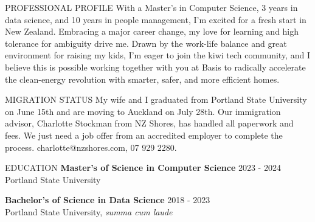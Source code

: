 \documentclass{resume}
\begin{document}
\begin{rSection}{PROFESSIONAL PROFILE}
With a Master’s in Computer Science, 3 years in data science, and 10 years in people management, I’m excited for a fresh start in New Zealand. Embracing a major career change, my love for learning and high tolerance for ambiguity drive me. Drawn by the work-life balance and great environment for raising my kids, I’m eager to join the kiwi tech community, and I believe this is possible working together with you at Basis to radically accelerate the clean-energy revolution with smarter, safer, and more efficient homes. 
\end{rSection}

\begin{rSection}{MIGRATION STATUS}
My wife and I graduated from Portland State University on June 15th and are moving to Auckland on July 28th. Our immigration advisor, Charlotte Stockman from NZ Shores, has handled all paperwork and fees. We just need a job offer from an accredited employer to complete the process. charlotte@nzshores.com, 07 929 2280.
\end{rSection}

\begin{rSection}{EDUCATION}
\textbf{Master's of Science in Computer Science} \hfill {2023 - 2024} \\
Portland State University

\textbf{Bachelor's of Science in Data Science} \hfill {2018 - 2023} \\
Portland State University, \textit{summa cum laude}
\end{rSection}
\end{document}
